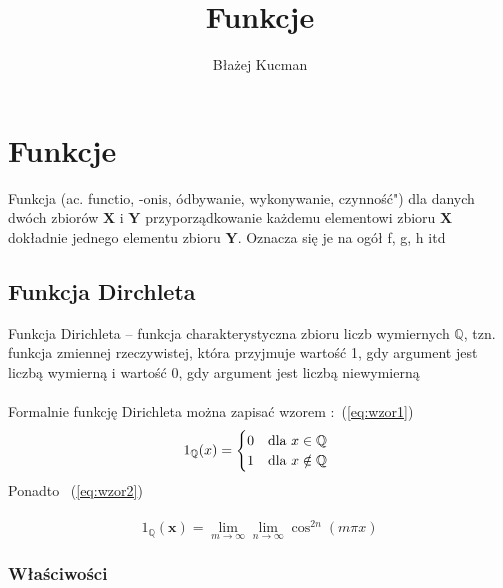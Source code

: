 \documentclass[a4paper]{article}
\title{Funkcje}
\author{Błażej Kucman}
\begin{document}
\maketitle
\tableofcontents
\listoffigures
\listoftables

\newpage

\section{Funkcje}

Funkcja (ac. functio, -onis, ódbywanie, wykonywanie, czynność")  dla danych dwóch zbiorów $\mathbf{X}$ i $\mathbf{Y}$ przyporządkowanie każdemu elementowi zbioru $\mathbf{X}$ dokładnie jednego elementu
zbioru $\mathbf{Y}$. Oznacza się je na ogół f, g, h itd

\subsection{Funkcja Dirchleta}
Funkcja Dirichleta – funkcja charakterystyczna zbioru liczb wymiernych
$\mathbb{Q}$, tzn. funkcja zmiennej rzeczywistej, która przyjmuje wartość 1, gdy argument jest liczbą wymierną i wartość 0, gdy argument jest liczbą niewymierną\\
\\
Formalnie funkcję Dirichleta można zapisać wzorem :~(\ref{eq:wzor1}) \\
\begin{equation}
\label{eq:wzor1}
1_\mathbb{Q}(x)=\begin{cases}
0 & \text{dla } x \in \mathbb{Q} \ \\ 
1 & \text{dla } x \notin \mathbb{Q} \
\end{cases}\\
\end{equation}
Ponadto ~(\ref{eq:wzor2})\\
\\
\begin{equation}
\label{eq:wzor2}
1_\mathbb{Q}(\mathbf{x}) =\lim_{m \rightarrow \infty}\lim_{n \rightarrow \infty}\cos^{2n}(m \pi x)
\end{equation}
\subsubsection{Właściwości}
\end{document}
